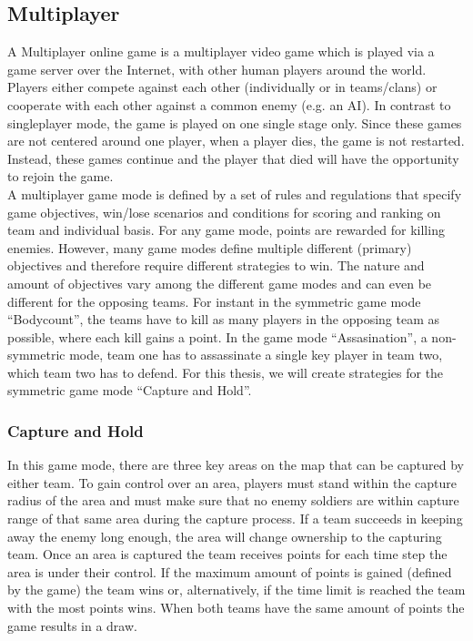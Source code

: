 \subsection{Multiplayer}
A Multiplayer online game is a multiplayer video game which is played via a
game server over the Internet, with other human players around the world.
Players either compete against each other (individually or in teams/clans) or
cooperate with each other against a common enemy (e.g. an AI). In contrast to
singleplayer mode, the game is played on one single stage only. Since these
games are not centered around one player, when a player dies, the game is not
restarted. Instead, these games continue and the player that died will have the
opportunity to rejoin the game. \\
A multiplayer game mode is defined by a set of rules and regulations that
specify game objectives, win/lose scenarios and conditions for scoring and
ranking on team and individual basis. For any game mode, points are rewarded
for killing enemies. However, many game modes define multiple different
(primary) objectives and therefore require different strategies to win. The
nature and amount of objectives vary among the different game modes and can
even be different for the opposing teams. For instant in the symmetric game
mode ``Bodycount'', the teams have to kill as many players in the opposing team
as possible, where each kill gains a point. In the game mode ``Assasination'',
a non-symmetric mode, team one has to assassinate a single key player in team
two, which team two has to defend. For this thesis, we will create strategies
for the symmetric game mode ``Capture and Hold''. 

\subsubsection{Capture and Hold}
In this game mode, there are three key areas on the map that can be captured
by either team. To gain control over an area, players must stand within the
capture radius of the area and must make sure that no enemy soldiers are within
capture range of that same area during the capture process. If a team succeeds
in keeping away the enemy long enough, the area will change ownership to the
capturing team. Once an area is captured the team receives points for each
time step the area is under their control.  If the maximum amount of points is
gained (defined by the game) the team wins or, alternatively, if the time limit
is reached the team with the most points wins. When both teams have the same
amount of points the game results in a draw.

